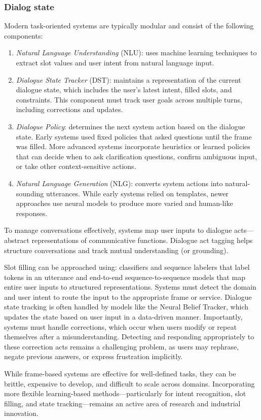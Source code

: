 \subsubsection{Dialog state}
Modern task-oriented systems are typically modular and consist of the following components:
\begin{enumerate}
    \item \textit{Natural Language Understanding} (NLU): uses machine learning techniques to extract slot values and user intent from natural language input.
    \item \textit{Dialogue State Tracker} (DST): maintains a representation of the current dialogue state, which includes the user's latest intent, filled slots, and constraints. 
        This component must track user goals across multiple turns, including corrections and updates.
    \item \textit{Dialogue Policy}: determines the next system action based on the dialogue state. 
        Early systems used fixed policies that asked questions until the frame was filled. 
        More advanced systems incorporate heuristics or learned policies that can decide when to ask clarification questions, confirm ambiguous input, or take other context-sensitive actions.
    \item \textit{Natural Language Generation} (NLG): converts system actions into natural-sounding utterances. 
        While early systems relied on templates, newer approaches use neural models to produce more varied and human-like responses.
\end{enumerate}
To manage conversations effectively, systems map user inputs to dialogue acts—abstract representations of communicative functions.
Dialogue act tagging helps structure conversations and track mutual understanding (or grounding).

Slot filling can be approached using: classifiers and sequence labelers that label tokens in an utterance and end-to-end sequence-to-sequence models that map entire user inputs to structured representations.
Systems must detect the domain and user intent to route the input to the appropriate frame or service.
Dialogue state tracking is often handled by models like the Neural Belief Tracker, which updates the state based on user input in a data-driven manner. 
Importantly, systems must handle corrections, which occur when users modify or repeat themselves after a misunderstanding. 
Detecting and responding appropriately to these correction acts remains a challenging problem, as users may rephrase, negate previous answers, or express frustration implicitly.

While frame-based systems are effective for well-defined tasks, they can be brittle, expensive to develop, and difficult to scale across domains. 
Incorporating more flexible learning-based methods—particularly for intent recognition, slot filling, and state tracking—remains an active area of research and industrial innovation.
